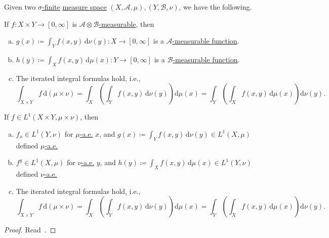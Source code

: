 \begin{theorem}\label{thm:Fubini-Tonelli}
	Given two \hyperref[def:finite-measure]{\(\sigma \)-finite} \hyperref[def:measure-space]{measure space} \((X, \mathcal{A} , \mu ), (Y, \mathcal{B} , \nu )\), we have the following.

	\begin{theorem*}\label{thm:Tonelli}
		If \(f\colon X\times Y\to [0, \infty ]\) is \hyperref[def:A-measurable-function]{\(\mathcal{A} \otimes \mathcal{B} \)-measurable}, then
		\begin{enumerate}[(a)]
			\item \(g(x) \coloneqq \int_Y f(x, y)\,\mathrm{d} \nu (y) \colon X\to [0, \infty ]\) is a \hyperref[def:A-measurable-function]{\(\mathcal{A}\)-measurable function}.
			\item \(h(y) \coloneqq \int_X f(x, y)\,\mathrm{d} \mu (x) \colon Y\to [0, \infty ]\) is a \hyperref[def:A-measurable-function]{\(\mathcal{B}\)-measurable function}.
			\item The iterated integral formulas hold, i.e.,
			      \[
				      \int_{X\times Y} f \,\mathrm{d}(\mu \times \nu ) = \int _X\left(\int _Y f(x, y)\,\mathrm{d}\nu (y)\right)\mathrm{d} \mu (x) = \int _Y\left(\int_X f(x, y)\,\mathrm{d} \mu (x)\right)\mathrm{d} \nu (y).
			      \]
		\end{enumerate}
	\end{theorem*}

	\begin{theorem*}\label{thm:Fubini}
		If \(f\in L^1(X\times Y, \mu \times \nu )\), then
		\begin{enumerate}[(a)]
			\item \(f_{x} \in L^1(Y, \nu )\) for \hyperref[def:mu-almost-everywhere]{\(\mu\)-a.e.} \(x\), and \(g(x) \coloneqq \int_Y f(x, y)\,\mathrm{d} \nu (y) \in L^1(X, \mu )\) defined \hyperref[def:mu-almost-everywhere]{\(\mu\)-a.e.}
			\item \(f^{y} \in L^1(X, \mu )\) for \hyperref[def:mu-almost-everywhere]{\(\nu\)-a.e.} \(y\), and \(h(y) \coloneqq \int_X f(x, y)\,\mathrm{d} \mu (x) \in L^1(Y, \nu )\) defined \hyperref[def:mu-almost-everywhere]{\(\nu\)-a.e.}
			\item The iterated integral formulas hold, i.e.,
			      \[
				      \int_{X\times Y} f \,\mathrm{d}(\mu \times \nu ) = \int _X\left(\int _Y f(x, y)\,\mathrm{d}\nu (y)\right)\mathrm{d} \mu (x) = \int _Y\left(\int_X f(x, y)\,\mathrm{d} \mu (x)\right)\mathrm{d} \nu (y).
			      \]
		\end{enumerate}
	\end{theorem*}
\end{theorem}
\begin{proof}
	Read~\cite{folland1999real}.
\end{proof}


